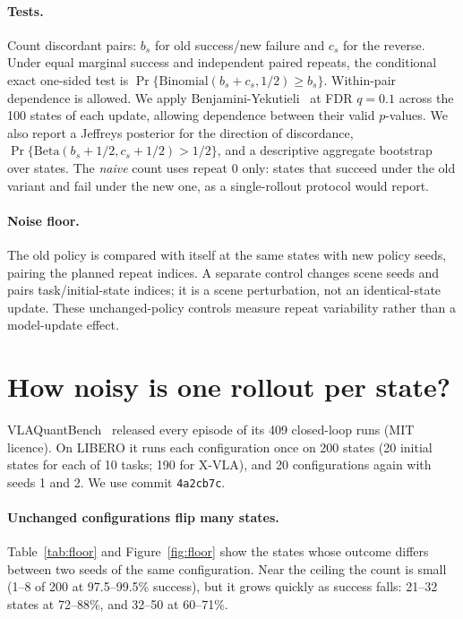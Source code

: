 \documentclass{article}
\begin{document}
\paragraph{Tests.} Count discordant pairs: $b_s$ for old success/new failure and $c_s$ for the
reverse. Under equal marginal success and independent paired repeats, the conditional exact
one-sided test is $\Pr\{\mathrm{Binomial}(b_s+c_s,1/2)\ge b_s\}$. Within-pair dependence is allowed.
We apply Benjamini-Yekutieli~\citep{benjamini2001dependency} at FDR $q=0.1$ across the 100 states
of each update, allowing dependence between their valid $p$-values. We also report a Jeffreys
posterior for the direction of discordance,
$\Pr\{\mathrm{Beta}(b_s+1/2,c_s+1/2)>1/2\}$, and a descriptive aggregate bootstrap over states.
The \emph{naive}
count uses repeat 0 only: states that succeed under the old variant and fail under the new one, as
a single-rollout protocol would report.

\paragraph{Noise floor.} The old policy is compared with itself at the same states with
new policy seeds, pairing the planned repeat indices. A separate control changes scene seeds
and pairs task/initial-state indices; it is a scene perturbation, not an identical-state update.
These unchanged-policy controls measure repeat variability rather than a model-update effect.

\section{How noisy is one rollout per state?}
\label{sec:floor}

VLAQuantBench~\citep{xu2026vlaquantbench} released every episode of its 409 closed-loop runs
(MIT licence). On LIBERO it runs each configuration once on 200 states (20 initial states for
each of 10 tasks; 190 for X-VLA), and 20 configurations again with seeds 1 and 2. We use commit
\texttt{4a2cb7c}.

\paragraph{Unchanged configurations flip many states.} Table~\ref{tab:floor} and
Figure~\ref{fig:floor} show the states whose outcome differs between two seeds of the same
configuration. Near the ceiling the count is small (1--8 of 200 at 97.5--99.5\% success), but it
grows quickly as success falls: 21--32 states at 72--88\%, and 32--50 at 60--71\%.
\end{document}
